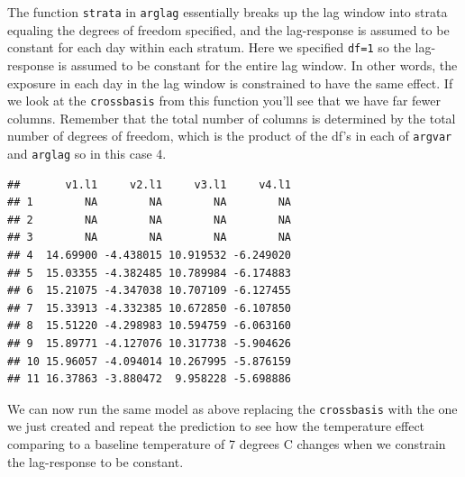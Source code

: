 \documentclass[
]{book}
\newenvironment{Shaded}{\begin{snugshade}}{\end{snugshade}}
\newcommand{\DecValTok}[1]{\textcolor[rgb]{0.00,0.00,0.81}{#1}}
\newcommand{\KeywordTok}[1]{\textcolor[rgb]{0.13,0.29,0.53}{\textbf{#1}}}
\newcommand{\NormalTok}[1]{#1}
\newcommand{\OperatorTok}[1]{\textcolor[rgb]{0.81,0.36,0.00}{\textbf{#1}}}
\newcommand{\StringTok}[1]{\textcolor[rgb]{0.31,0.60,0.02}{#1}}
\begin{document}
The function \texttt{strata} in \texttt{arglag} essentially breaks up the lag window into strata equaling the degrees of freedom specified, and the lag-response is assumed to be constant for each day within each stratum. Here we specified \texttt{df=1} so the lag-response is assumed to be constant for the entire lag window. In other words, the exposure in each day in the lag window is constrained to have the same effect. If we look at the \texttt{crossbasis} from this function you'll see that we have far fewer columns. Remember that the total number of columns is determined by the total number of degrees of freedom, which is the product of the df's in each of \texttt{argvar} and \texttt{arglag} so in this case 4.

\begin{Shaded}
\end{Shaded}

\begin{verbatim}
##       v1.l1     v2.l1     v3.l1     v4.l1
## 1        NA        NA        NA        NA
## 2        NA        NA        NA        NA
## 3        NA        NA        NA        NA
## 4  14.69900 -4.438015 10.919532 -6.249020
## 5  15.03355 -4.382485 10.789984 -6.174883
## 6  15.21075 -4.347038 10.707109 -6.127455
## 7  15.33913 -4.332385 10.672850 -6.107850
## 8  15.51220 -4.298983 10.594759 -6.063160
## 9  15.89771 -4.127076 10.317738 -5.904626
## 10 15.96057 -4.094014 10.267995 -5.876159
## 11 16.37863 -3.880472  9.958228 -5.698886
\end{verbatim}

We can now run the same model as above replacing the \texttt{crossbasis} with the one we just created and
repeat the prediction to see how the temperature effect comparing to a baseline temperature
of 7 degrees C changes when we constrain the lag-response to be constant.
\end{document}
